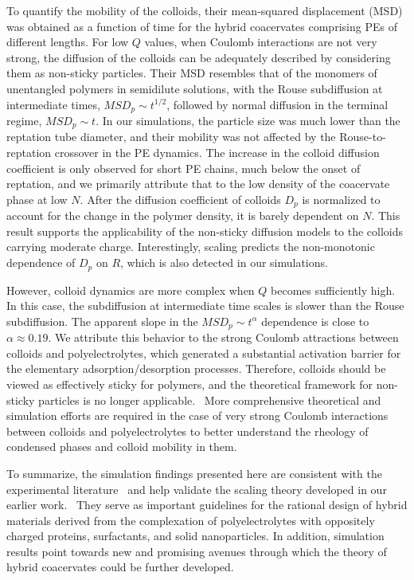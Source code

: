 \documentclass[journal=mamobx, manuscript=article]{achemso}
\begin{document}
To quantify the mobility of the colloids, their mean-squared displacement (MSD) was obtained as a function of time for the hybrid coacervates comprising PEs of different lengths. For low $Q$ values, when Coulomb interactions are not very strong, the diffusion of the colloids can be adequately described by considering them as non-sticky particles. Their MSD resembles that of the monomers of unentangled polymers in semidilute solutions, with the Rouse subdiffusion at intermediate times, $MSD_{p} \sim t^{1/2}$, followed by normal diffusion in the terminal regime, $MSD_{p} \sim t$. In our simulations, the particle size was much lower than the reptation tube diameter, and their mobility was not affected by the Rouse-to-reptation crossover in the PE dynamics. The increase in the colloid diffusion coefficient is only observed for short PE chains, much below the onset of reptation, and we primarily attribute that to the low density of the coacervate phase at low $N$. After the diffusion coefficient of colloids $D_{p}$ is normalized to account for the change in the polymer density, it is barely dependent on $N$. This result supports the applicability of the non-sticky diffusion models to the colloids carrying moderate charge. Interestingly, scaling predicts the non-monotonic dependence of $D_{p}$ on $R$, which is also detected in our simulations.

However, colloid dynamics are more complex when $Q$ becomes sufficiently high. In this case, the subdiffusion at intermediate time scales is slower than the Rouse subdiffusion. The apparent slope in the $MSD_{p} \sim t^{\alpha}$ dependence is close to $\alpha \approx 0.19$. We attribute this behavior to the strong Coulomb attractions between colloids and polyelectrolytes, which generated a substantial activation barrier for the elementary adsorption/desorption processes. Therefore, colloids should be viewed as effectively sticky for polymers, and the theoretical framework for non-sticky particles is no longer applicable.~\cite{artem2022hybrid} More comprehensive theoretical and simulation efforts are required in the case of very strong Coulomb interactions between colloids and polyelectrolytes to better understand the rheology of condensed phases and colloid mobility in them.

To summarize, the simulation findings presented here are consistent with the experimental literature~\cite{cummings2018phase, yeong2020formation} and help validate the scaling theory developed in our earlier work.~\cite{artem2022hybrid} They serve as important guidelines for the rational design of hybrid materials derived from the complexation of polyelectrolytes with oppositely charged proteins, surfactants, and solid nanoparticles. In addition, simulation results point towards new and promising avenues through which the theory of hybrid coacervates could be further developed.
\end{document}

